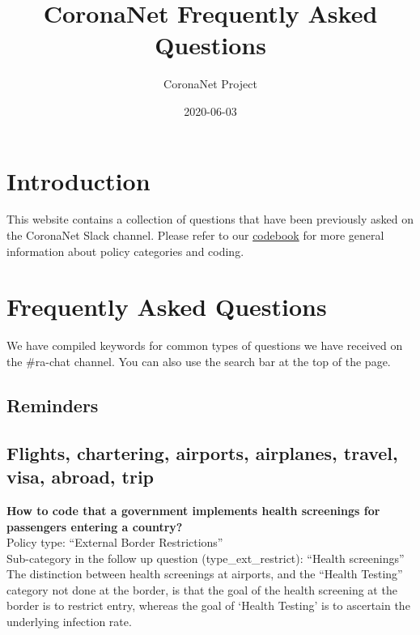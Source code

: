 \documentclass[
]{book}
\title{CoronaNet Frequently Asked Questions}
\author{CoronaNet Project}
\date{2020-06-03}
\begin{document}
\maketitle

{
\setcounter{tocdepth}{1}
\tableofcontents
}
\hypertarget{introduction}{%
\chapter{Introduction}\label{introduction}}

This website contains a collection of questions that have been previously asked on the CoronaNet Slack channel. Please refer to our \href{https://docs.google.com/document/d/1zvNMpwj0onFvUZ_gLl4RRjqS-clbHv3TIX6EOHofsME/edit}{codebook} for more general information about policy categories and coding.

\hypertarget{frequently-asked-questions}{%
\chapter{Frequently Asked Questions}\label{frequently-asked-questions}}

We have compiled keywords for common types of questions we have received on the \#ra-chat channel. You can also use the search bar at the top of the page.

\hypertarget{reminders}{%
\section{Reminders}\label{reminders}}

\hypertarget{flights-chartering-airports-airplanes-travel-visa-abroad-trip}{%
\section{Flights, chartering, airports, airplanes, travel, visa, abroad, trip}\label{flights-chartering-airports-airplanes-travel-visa-abroad-trip}}

\textbf{How to code that a government implements health screenings for passengers entering a country?}\\
Policy type: ``External Border Restrictions''\\
Sub-category in the follow up question (type\_ext\_restrict): ``Health screenings''\\
The distinction between health screenings at airports, and the ``Health Testing'' category not done at the border, is that the goal of the health screening at the border is to restrict entry, whereas the goal of `Health Testing' is to ascertain the underlying infection rate.
\end{document}
